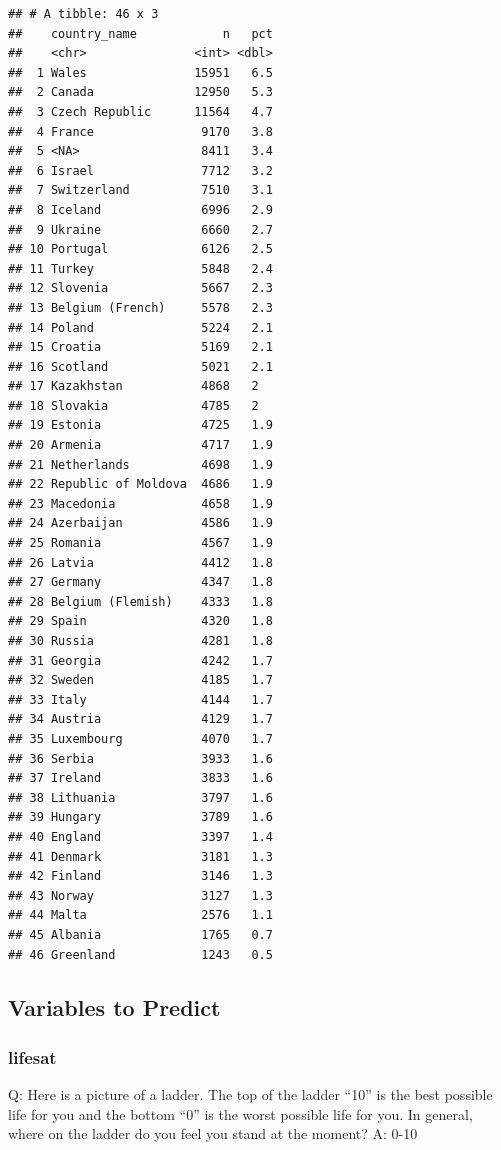 \documentclass[
]{article}
\begin{document}
\begin{verbatim}
## # A tibble: 46 x 3
##    country_name            n   pct
##    <chr>               <int> <dbl>
##  1 Wales               15951   6.5
##  2 Canada              12950   5.3
##  3 Czech Republic      11564   4.7
##  4 France               9170   3.8
##  5 <NA>                 8411   3.4
##  6 Israel               7712   3.2
##  7 Switzerland          7510   3.1
##  8 Iceland              6996   2.9
##  9 Ukraine              6660   2.7
## 10 Portugal             6126   2.5
## 11 Turkey               5848   2.4
## 12 Slovenia             5667   2.3
## 13 Belgium (French)     5578   2.3
## 14 Poland               5224   2.1
## 15 Croatia              5169   2.1
## 16 Scotland             5021   2.1
## 17 Kazakhstan           4868   2  
## 18 Slovakia             4785   2  
## 19 Estonia              4725   1.9
## 20 Armenia              4717   1.9
## 21 Netherlands          4698   1.9
## 22 Republic of Moldova  4686   1.9
## 23 Macedonia            4658   1.9
## 24 Azerbaijan           4586   1.9
## 25 Romania              4567   1.9
## 26 Latvia               4412   1.8
## 27 Germany              4347   1.8
## 28 Belgium (Flemish)    4333   1.8
## 29 Spain                4320   1.8
## 30 Russia               4281   1.8
## 31 Georgia              4242   1.7
## 32 Sweden               4185   1.7
## 33 Italy                4144   1.7
## 34 Austria              4129   1.7
## 35 Luxembourg           4070   1.7
## 36 Serbia               3933   1.6
## 37 Ireland              3833   1.6
## 38 Lithuania            3797   1.6
## 39 Hungary              3789   1.6
## 40 England              3397   1.4
## 41 Denmark              3181   1.3
## 42 Finland              3146   1.3
## 43 Norway               3127   1.3
## 44 Malta                2576   1.1
## 45 Albania              1765   0.7
## 46 Greenland            1243   0.5
\end{verbatim}

\subsection{Variables to Predict}\label{variables-to-predict}

\subsubsection{lifesat}\label{lifesat}

Q: Here is a picture of a ladder. The top of the ladder ``10'' is the
best possible life for you and the bottom ``0'' is the worst possible
life for you. In general, where on the ladder do you feel you stand at
the moment? A: 0-10
\end{document}
